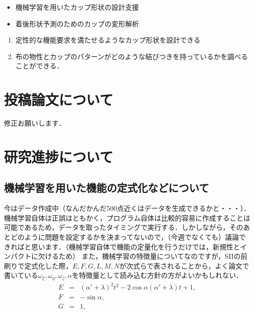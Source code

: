\documentclass[11pt]{jsarticle}
\begin{document}
	\articleSPRabst
		\begin{itemize}
			\item 機械学習を用いたカップ形状の設計支援
			\item 着後形状予測のためのカップの変形解析
		\end{itemize}
		
		
	\articleSPRobj
		\begin{enumerate}
			\item 定性的な機能要求を満たせるようなカップ形状を設計できる
			\item 布の物性とカップのパターンがどのような結びつきを持っているかを調べることができる．
		\end{enumerate}
	\articleSPRitemsone
		
		\tableofcontents
		
		
	\articleSPRitemstwo
	\renewcommand{\labelitemi}{$\blacktriangledown$}
	\section{投稿論文について}
		修正お願いします．
		
	\section{研究進捗について}
		\subsection{機械学習を用いた機能の定式化などについて}
			今はデータ作成中（なんだかんだ500点近くはデータを生成できるかと・・・）．機械学習自体は正誤はともかく，プログラム自体は比較的容易に作成することは可能であるため，データを取ったタイミングで実行する．しかしながら，そのあとどのように問題を設定するかを決まってないので，（今週でなくても）議論できればと思います．（機械学習自体で機能の定量化を行うだけでは，新規性とインパクトに欠けるため）
			また，機械学習の特徴量についてなのですが，SIIの前刷りで定式化した際，$ E,F,G,L,M,N $が次式らで表されることから，よく論文で書いている$ \omega_{\xi},\omega_{\eta},\omega_{\zeta},\alpha $を特徴量として読み込む方針の方がよいかもしれない．
			\begin{eqnarray}
				E &=& (\alpha'+\lambda)^2 t^2 -2\cos \alpha(\alpha'+\lambda) t + 1,\\
				F &=& -\sin \alpha,\\
				G &=& 1,
			\end{eqnarray}
			
\end{document}
